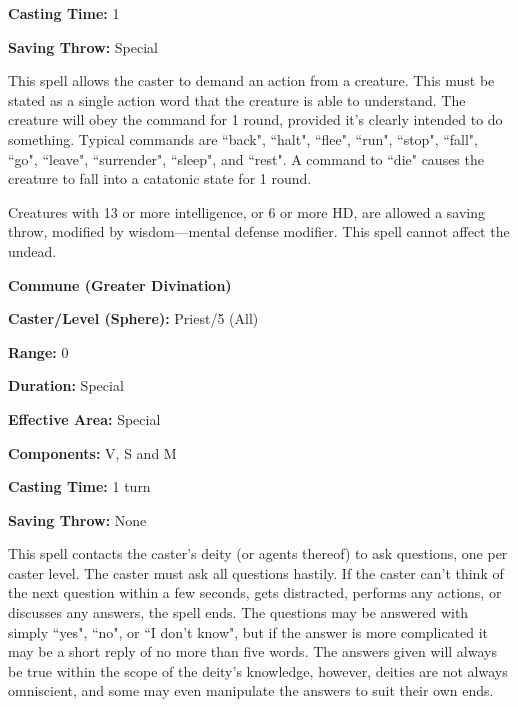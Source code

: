 \begin{multicols}{2}
\begin{minipage}{\columnwidth}
\noindent \textbf{Casting Time:} 1

\noindent \textbf{Saving Throw:} Special

\end{minipage}

This spell allows the caster to demand an action from a creature.  This must be stated as a single action word that the creature is able to understand.  The creature will obey the command for 1 round, provided it's clearly intended to do something.  Typical commands are ``back", ``halt", ``flee", ``run", ``stop", ``fall", ``go", ``leave", ``surrender", ``sleep", and ``rest".  A command to ``die" causes the creature to fall into a catatonic state for 1 round.  

Creatures with 13 or more intelligence, or 6 or more HD, are allowed a saving throw, modified by wisdom---mental defense modifier.  This spell cannot affect the undead.

\vspace{1em}

\noindent
\begin{minipage}{\columnwidth}

\noindent \textbf{Commune (Greater Divination)}

\noindent \textbf{Caster/Level (Sphere):} Priest/5 (All)

\noindent \textbf{Range:} 0

\noindent \textbf{Duration:} Special

\noindent \textbf{Effective Area:} Special

\noindent \textbf{Components:} V, S and M

\noindent \textbf{Casting Time:} 1 turn

\noindent \textbf{Saving Throw:} None

\end{minipage}

This spell contacts the caster's deity (or agents thereof) to ask questions, one per caster level.  The caster must ask all questions hastily.  If the caster can't think of the next question within a few seconds, gets distracted, performs any actions, or discusses any answers, the spell ends.  The questions may be answered with simply ``yes",  ``no", or ``I don't know", but if the answer is more complicated it may be a short reply of no more than five words.  The answers given will always be true within the scope of the deity's knowledge, however, deities are not always omniscient, and some may even manipulate the answers to suit their own ends.


\end{multicols}
